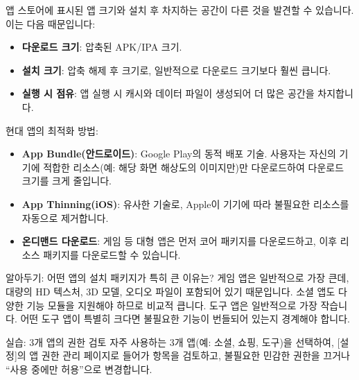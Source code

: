 앱 스토어에 표시된 앱 크기와 설치 후 차지하는 공간이 다른 것을 발견할 수 있습니다. 이는 다음 때문입니다:

\begin{itemize}
  \item \textbf{다운로드 크기}: 압축된 APK/IPA 크기.
  \item \textbf{설치 크기}: 압축 해제 후 크기로, 일반적으로 다운로드 크기보다 훨씬 큽니다.
  \item \textbf{실행 시 점유}: 앱 실행 시 캐시와 데이터 파일이 생성되어 더 많은 공간을 차지합니다.
\end{itemize}

현대 앱의 최적화 방법:

\begin{itemize}
  \item \textbf{App Bundle(안드로이드)}: Google Play의 동적 배포 기술. 사용자는 자신의 기기에 적합한 리소스(예: 해당 화면 해상도의 이미지만)만 다운로드하여 다운로드 크기를 크게 줄입니다.
  \item \textbf{App Thinning(iOS)}: 유사한 기술로, Apple이 기기에 따라 불필요한 리소스를 자동으로 제거합니다.
  \item \textbf{온디맨드 다운로드}: 게임 등 대형 앱은 먼저 코어 패키지를 다운로드하고, 이후 리소스 패키지를 다운로드할 수 있습니다.
\end{itemize}

\begin{tcbinfo}{알아두기: 어떤 앱의 설치 패키지가 특히 큰 이유는?}
게임 앱은 일반적으로 가장 큰데, 대량의 HD 텍스처, 3D 모델, 오디오 파일이 포함되어 있기 때문입니다. 소셜 앱도 다양한 기능 모듈을 지원해야 하므로 비교적 큽니다. 도구 앱은 일반적으로 가장 작습니다. 어떤 도구 앱이 특별히 크다면 불필요한 기능이 번들되어 있는지 경계해야 합니다.

\end{tcbinfo}

\begin{tcbpractice}{실습: 3개 앱의 권한 검토}
자주 사용하는 3개 앱(예: 소셜, 쇼핑, 도구)을 선택하여, [설정]의 앱 권한 관리 페이지로 들어가 항목을 검토하고, 불필요한 민감한 권한을 끄거나 “사용 중에만 허용”으로 변경합니다.

\end{tcbpractice}
